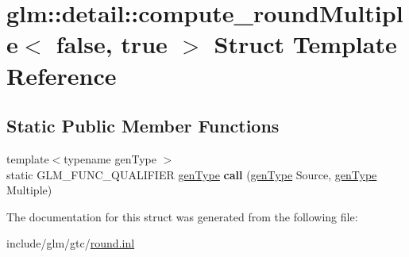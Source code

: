 \hypertarget{structglm_1_1detail_1_1compute__roundMultiple_3_01false_00_01true_01_4}{}\section{glm\+:\+:detail\+:\+:compute\+\_\+round\+Multiple$<$ false, true $>$ Struct Template Reference}
\label{structglm_1_1detail_1_1compute__roundMultiple_3_01false_00_01true_01_4}
\subsection*{Static Public Member Functions}
\begin{DoxyCompactItemize}
\item 
\mbox{\label{structglm_1_1detail_1_1compute__roundMultiple_3_01false_00_01true_01_4_a9f9791732bf5427c856feac9fed810da}} 
{\footnotesize template$<$typename gen\+Type $>$ }\\static G\+L\+M\+\_\+\+F\+U\+N\+C\+\_\+\+Q\+U\+A\+L\+I\+F\+I\+ER \hyperlink{structglm_1_1detail_1_1genType}{gen\+Type} {\bfseries call} (\hyperlink{structglm_1_1detail_1_1genType}{gen\+Type} Source, \hyperlink{structglm_1_1detail_1_1genType}{gen\+Type} Multiple)
\end{DoxyCompactItemize}


The documentation for this struct was generated from the following file\+:\begin{DoxyCompactItemize}
\item 
include/glm/gtc/\hyperlink{round_8inl}{round.\+inl}\end{DoxyCompactItemize}
